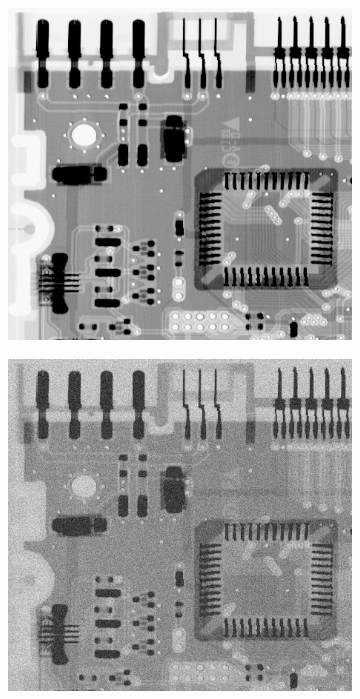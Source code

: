 \begin{figure}[h]
	\centering
	\begin{subfigure}[b]{0.4\linewidth}
		\includegraphics[width=\linewidth]{myfigure/p4/42-orig.png}
		\caption{}
		\label{fig:5-7a}
	\end{subfigure}
  	\begin{subfigure}[b]{0.4\linewidth}
		\includegraphics[width=\linewidth]{myfigure/p4/42-gaussian.png}

\end{subfigure}
\end{figure}
